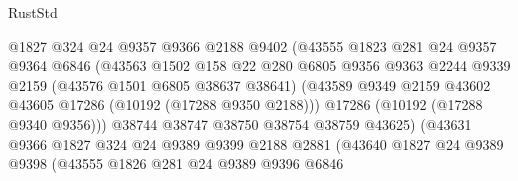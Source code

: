 \begin{lexlean}{RustStd}
\begin{coremodule}
                                @1827
                                @324
                                @24
                                @9357
                                @9366
                                @2188
                                @9402
                                (@43555
                                  @1823
                                  @281
                                  @24
                                  @9357
                                  @9364
                                  @6846
                                  (@43563
                                    @1502
                                    @158
                                    @22
                                    @280
                                    @6805
                                    @9356
                                    @9363
                                    @2244
                                    @9339
                                    @2159
                                    (@43576 @1501 @6805 @38637 @38641)
                                    (@43589
                                      @9349
                                      @2159
                                      @43602
                                      @43605
                                      @17286
                                      (@10192 (@17288 @9350 @2188)))
                                    @17286
                                    (@10192 (@17288 @9340 @9356)))
                                  @38744
                                  @38747
                                  @38750
                                  @38754
                                  @38759
                                  @43625)
                                (@43631
                                  @9366
                                  @1827
                                  @324
                                  @24
                                  @9389
                                  @9399
                                  @2188
                                  @2881
                                  (@43640
                                    @1827
                                    @24
                                    @9389
                                    @9398
                                    (@43555
                                      @1826
                                      @281
                                      @24
                                      @9389
                                      @9396
                                      @6846

\end{coremodule}
\end{lexlean}
